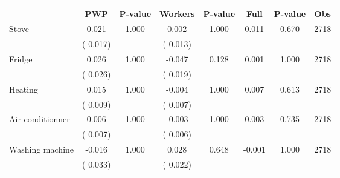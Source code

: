 
\begin{tabular}{l*{7}{c}}\hline&\multicolumn{1}{c}{PWP}&\multicolumn{1}{c}{P-value}&\multicolumn{1}{c}{Workers}&\multicolumn{1}{c}{P-value}&\multicolumn{1}{c}{Full}&\multicolumn{1}{c}{P-value}&\multicolumn{1}{c}{Obs} \\ \hline

 Stove       &              0.021       &        1.000  &              0.002       &        1.000  &              0.011       &              0.670 &  2718 \\ 
                       &       (       0.017)             &                               &       (       0.013)                     &                               &                                               &                                &                      \\ 

 Fridge       &              0.026       &        1.000  &             -0.047       &        0.128  &              0.001       &              1.000 &  2718 \\ 
                       &       (       0.026)             &                               &       (       0.019)                     &                               &                                               &                                &                      \\ 

 Heating       &              0.015       &        1.000  &             -0.004       &        1.000  &              0.007       &              0.613 &  2718 \\ 
                       &       (       0.009)             &                               &       (       0.007)                     &                               &                                               &                                &                      \\ 

 Air conditionner       &              0.006       &        1.000  &             -0.003       &        1.000  &              0.003       &              0.735 &  2718 \\ 
                       &       (       0.007)             &                               &       (       0.006)                     &                               &                                               &                                &                      \\ 

 Washing machine       &             -0.016       &        1.000  &              0.028       &        0.648  &             -0.001       &              1.000 &  2718 \\ 
                       &       (       0.033)             &                               &       (       0.022)                     &                               &                                               &                                &                      \\ 


\end{tabular}
